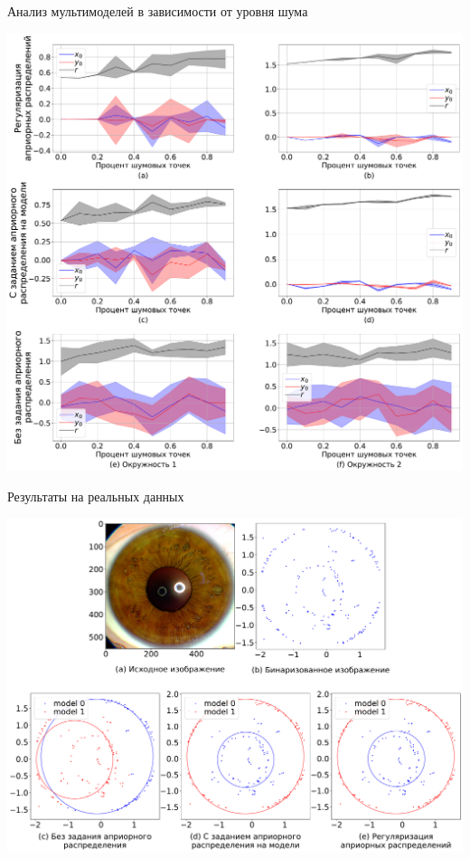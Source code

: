 \documentclass[9pt,pdf,hyperref={unicode}]{beamer}
\begin{document}
\begin{frame}{Анализ мультимоделей в зависимости от уровня шума}
\justifying
\begin{center}
	\includegraphics[height=0.9\textheight]{result/experiment_synthetic_param_progress_noise}
\end{center}

\end{frame}
\begin{frame}{Результаты на реальных данных}
\justifying
\begin{center}
	\includegraphics[height=0.9\textheight]{result/experiment_real_compare}
\end{center}

\end{frame}
\end{document}
